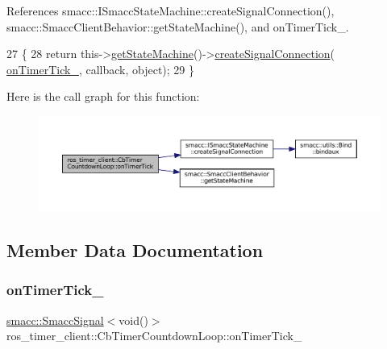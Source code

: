References smacc\+::\+I\+Smacc\+State\+Machine\+::create\+Signal\+Connection(), smacc\+::\+Smacc\+Client\+Behavior\+::get\+State\+Machine(), and on\+Timer\+Tick\+\_\+.


\begin{DoxyCode}
27     \{
28         \textcolor{keywordflow}{return} this->\hyperlink{classsmacc_1_1SmaccClientBehavior_aa817da149f366f6a28794c04eb0744b0}{getStateMachine}()->\hyperlink{classsmacc_1_1ISmaccStateMachine_adf0f42ade0c65cc471960fe2a7c42da2}{createSignalConnection}(
      \hyperlink{classros__timer__client_1_1CbTimerCountdownLoop_aebbc8d9b3b4f6a6b8b9dd8b46d9264d6}{onTimerTick\_}, callback, \textcolor{keywordtype}{object});
29     \}
\end{DoxyCode}
Here is the call graph for this function\+:
\nopagebreak
\begin{figure}[H]
\begin{center}
\leavevmode
\includegraphics[width=350pt]{classros__timer__client_1_1CbTimerCountdownLoop_a7ebf87093607e9497f18eb0ded9fc1f9_cgraph}
\end{center}
\end{figure}


\subsection{Member Data Documentation}
\mbox{\label{classros__timer__client_1_1CbTimerCountdownLoop_aebbc8d9b3b4f6a6b8b9dd8b46d9264d6}} 
\subsubsection{\texorpdfstring{on\+Timer\+Tick\+\_\+}{onTimerTick\_}}
{\footnotesize\ttfamily \hyperlink{classsmacc_1_1SmaccSignal}{smacc\+::\+Smacc\+Signal}$<$void()$>$ ros\+\_\+timer\+\_\+client\+::\+Cb\+Timer\+Countdown\+Loop\+::on\+Timer\+Tick\+\_\+\hspace{0.3cm}{\ttfamily [private]}}




